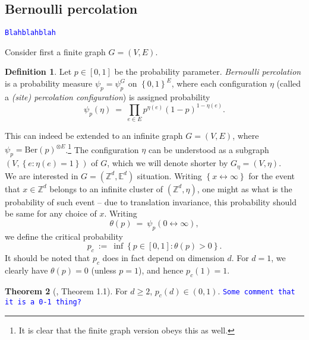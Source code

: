\documentclass[12pt]{article}
\newcommand{\Z}{\mathbb{Z}}
\newcommand{\set}[1]{\left\{#1\right\}}
\newcommand{\1}{\mathbbm{1}}
\newcommand{\5}{\vspace{0.5cm}}
\theoremstyle{definition}
\newtheorem{thm}{Theorem}[section]
\newtheorem{df}[thm]{Definition}
\begin{document}

\subsection{Bernoulli percolation}

\textcolor{blue}{\texttt{Blahblahblah}} %

Consider first a finite graph $G=(V,E)$.
\begin{df}
Let $p\in[0,1]$ be the probability parameter. \textit{Bernoulli percolation} is a probability measure $\psi_p=\psi_p^G$ on $\set{0,1}^E$, where each configuration $\eta$ (called a \textit{(site) percolation configuration}) is assigned probability
$$\psi_p(\eta) ~=~ \prod_{e\in E}p^{\eta(e)}(1-p)^{1-\eta(e)}.$$
\end{df}
This can indeed be extended to an infinite graph $G=(V,E)$, where $\psi_p=\mathrm{Ber}(p)^{\otimes E}$.\footnote{It is clear that the finite graph version obeys this as well.} The configuration $\eta$ can be understood as a subgraph $(V,\set{e:\eta(e)=1})$ of $G$, which we will denote shorter by $G_\eta=(V,\eta)$.\\

We are interested in $G=(\Z^d,\mathbb{E}^d)$ situation. Writing $\set{x\leftrightarrow\infty}$ for the event that $x\in\Z^d$ belongs to an infinite cluster of $(\Z^d,\eta)$, one might as  what is the probability of such event -- due to translation invariance, this probability should be same for any choice of $x$. Writing
$$\theta(p) ~=~ \psi_p(0\leftrightarrow\infty),$$
we define the critical probability
$$p_c ~:=~ \inf\set{p\in[0,1]:\theta(p)>0}.$$
It should be noted that $p_c$ does in fact depend on dimension $d$. For $d=1$, we clearly have $\theta(p)=0$ (unless $p=1$), and hence $p_c(1)=1$. 

\begin{thm}[\cite{D-C}, Theorem 1.1]
For $d\geq 2$, $p_c(d)\in (0,1)$. \textcolor{blue}{\texttt{Some comment that it is a 0-1 thing?}}
\end{thm} 


\pagebreak

\end{document}
